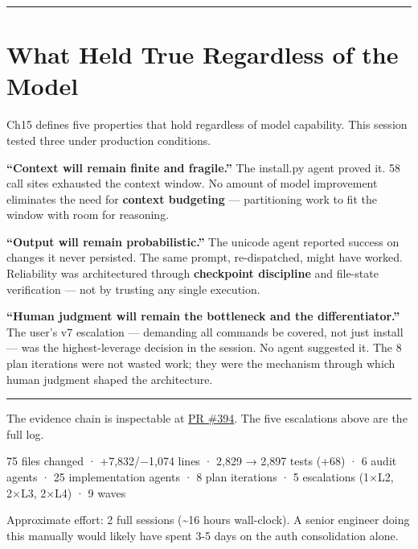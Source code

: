\documentclass[
  a4paper,
  DIV=11,
  numbers=noendperiod]{scrreprt}
\begin{document}
\begin{center}\rule{0.5\linewidth}{0.5pt}\end{center}

\section{What Held True Regardless of the
Model}\label{what-held-true-regardless-of-the-model}

Ch15 defines five properties that hold regardless of model capability.
This session tested three under production conditions.

\textbf{``Context will remain finite and fragile.''} The install.py
agent proved it. 58 call sites exhausted the context window. No amount
of model improvement eliminates the need for \textbf{context budgeting}
--- partitioning work to fit the window with room for reasoning.

\textbf{``Output will remain probabilistic.''} The unicode agent
reported success on changes it never persisted. The same prompt,
re-dispatched, might have worked. Reliability was architectured through
\textbf{checkpoint discipline} and file-state verification --- not by
trusting any single execution.

\textbf{``Human judgment will remain the bottleneck and the
differentiator.''} The user's v7 escalation --- demanding all commands
be covered, not just install --- was the highest-leverage decision in
the session. No agent suggested it. The 8 plan iterations were not
wasted work; they were the mechanism through which human judgment shaped
the architecture.

\begin{center}\rule{0.5\linewidth}{0.5pt}\end{center}

The evidence chain is inspectable at
\href{https://github.com/microsoft/apm/pull/394}{PR \#394}. The five
escalations above are the full log.

\begin{tcolorbox}[enhanced jigsaw, arc=.35mm, bottomrule=.15mm, bottomtitle=1mm, breakable, colback=white, colbacktitle=quarto-callout-note-color!10!white, colframe=quarto-callout-note-color-frame, coltitle=black, left=2mm, leftrule=.75mm, opacityback=0, opacitybacktitle=0.6, rightrule=.15mm, title=\textcolor{quarto-callout-note-color}{\faInfo}\hspace{0.5em}{Metrics}, titlerule=0mm, toprule=.15mm, toptitle=1mm]

75 files changed · +7,832/−1,074 lines · 2,829 → 2,897 tests (+68) · 6
audit agents · 25 implementation agents · 8 plan iterations · 5
escalations (1×L2, 2×L3, 2×L4) · 9 waves

Approximate effort: 2 full sessions (\textasciitilde16 hours
wall-clock). A senior engineer doing this manually would likely have
spent 3-5 days on the auth consolidation alone.

\end{tcolorbox}
\end{document}
